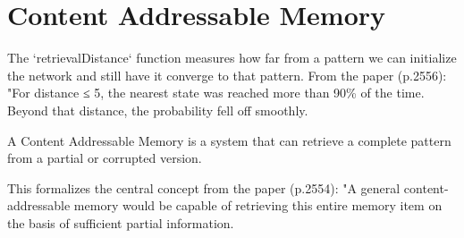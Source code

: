 



























\section{Content Addressable Memory}

\begin{definition}\label{retrievalDistance}
\leanok
The `retrievalDistance` function measures how far from a pattern we can initialize
the network and still have it converge to that pattern. 
From the paper (p.2556): "For distance ≤ 5, the nearest state was reached more than
90\% of the time. Beyond that distance, the probability fell off smoothly.
\end{definition}

\begin{definition}\label{ContentAddressableMemory}
\leanok
A Content Addressable Memory is a system that can retrieve a complete pattern
from a partial or corrupted version.

This formalizes the central concept from the paper (p.2554):
"A general content-addressable memory would be capable of retrieving this entire
memory item on the basis of sufficient partial information.
\end{definition}

